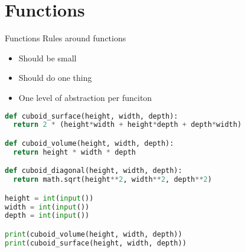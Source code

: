 \documentclass{beamer}
\begin{document}
\section{Functions}
\begin{frame}{Functions}
  Rules around functions
  \begin{itemize}
    \item Should be small
    \item Should do one thing
    \item One level of abstraction per funciton
  \end{itemize}
\end{frame}

\begin{frame}[fragile]
  \begin{lstlisting}[language=Python]
def cuboid_surface(height, width, depth):
  return 2 * (height*width + height*depth + depth*width)

def cuboid_volume(height, width, depth):
  return height * width * depth

def cuboid_diagonal(height, width, depth):
  return math.sqrt(height**2, width**2, depth**2)

height = int(input())
width = int(input())
depth = int(input())

print(cuboid_volume(height, width, depth))
print(cuboid_surface(height, width, depth))\end{lstlisting}

\end{frame}
\end{document}
